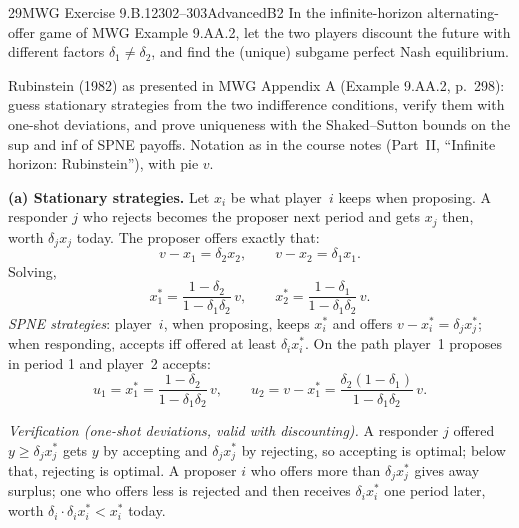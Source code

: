 \begin{exsol}{29}{MWG Exercise 9.B.12}{302--303}{Advanced}{B2}
\asked In the infinite-horizon alternating-offer game of MWG Example 9.AA.2, let the two players
discount the future with different factors $\delta_1 \neq \delta_2$, and find the (unique) subgame
perfect Nash equilibrium.

\method Rubinstein (1982) as presented in MWG Appendix A (Example 9.AA.2, p.~298): guess
stationary strategies from the two indifference conditions, verify them with one-shot
deviations, and prove uniqueness with the Shaked--Sutton bounds on the sup and inf of SPNE
payoffs. Notation as in the course notes (Part~II, ``Infinite horizon: Rubinstein''), with pie $v$.

\solution
\textbf{(a) Stationary strategies.} Let $x_i$ be what player~$i$ keeps when proposing. A
responder $j$ who rejects becomes the proposer next period and gets $x_j$ then, worth
$\delta_j x_j$ today. The proposer offers exactly that:
\[
  v - x_1 = \delta_2 x_2, \qquad v - x_2 = \delta_1 x_1 .
\]
Solving,
\[
  \boxed{x_1^* = \frac{1 - \delta_2}{1 - \delta_1\delta_2}\,v, \qquad
  x_2^* = \frac{1 - \delta_1}{1 - \delta_1\delta_2}\,v .}
\]
\emph{SPNE strategies}: player~$i$, when proposing, keeps $x_i^*$ and offers
$v - x_i^* = \delta_j x_j^*$; when responding, accepts iff offered at least $\delta_i x_i^*$.
On the path player~1 proposes in period 1 and player~2 accepts:
\[
  u_1 = x_1^* = \frac{1 - \delta_2}{1 - \delta_1\delta_2}\,v, \qquad
  u_2 = v - x_1^* = \frac{\delta_2(1 - \delta_1)}{1 - \delta_1\delta_2}\,v .
\]

\emph{Verification (one-shot deviations, valid with discounting).} A responder $j$ offered
$y \ge \delta_j x_j^*$ gets $y$ by accepting and $\delta_j x_j^*$ by rejecting, so accepting is
optimal; below that, rejecting is optimal. A proposer $i$ who offers more than $\delta_j x_j^*$
gives away surplus; one who offers less is rejected and then receives $\delta_i x_i^*$ one period
later, worth $\delta_i \cdot \delta_i x_i^* < x_i^*$ today.


\end{exsol}
